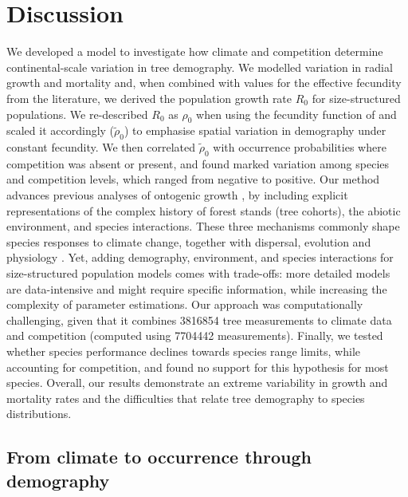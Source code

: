 
\section{Discussion}
We developed a model to investigate how climate and competition determine continental-scale variation in tree demography. We modelled variation in radial growth and mortality and, when combined with values for the effective fecundity from the literature, we derived the population growth rate $ R_0 $ for size-structured populations. We re-described $ R_0 $ as $ \rho_0 $ when using the fecundity function of \citet{Purves2008} and scaled it accordingly (\ie $ \tilde \rho_0 $) to emphasise spatial variation in demography under constant fecundity. We then correlated $ \tilde \rho_0 $ with occurrence probabilities where competition was absent or present, and found marked variation among species and competition levels, which ranged from negative to positive. Our method advances previous analyses of ontogenic growth \citep{McGill2012, Thuiller2014}, by including explicit representations of the complex history of forest stands (\ie tree cohorts), the abiotic environment, and species interactions. These three mechanisms commonly shape species responses to climate change, together with dispersal, evolution and physiology \citep{Urban2016}. Yet, adding demography, environment, and species interactions for size-structured population models comes with trade-offs: more detailed models are data-intensive and might require specific information, while increasing the complexity of parameter estimations. Our approach was computationally challenging, given that it combines \num{3816854} tree measurements to climate data and competition (computed using \num{7704442} measurements). Finally, we tested whether species performance declines towards species range limits, while accounting for competition, and found no support for this hypothesis for most species. Overall, our results demonstrate an extreme variability in growth and mortality rates and the difficulties that relate tree demography to species distributions.

\subsection{From climate to occurrence through demography}
